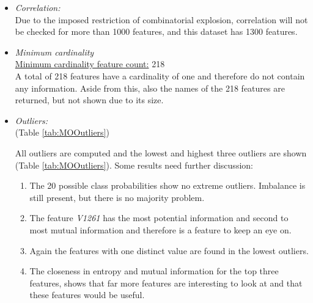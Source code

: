\documentclass[10pt,a4paper]{article}
\begin{document}
	\begin{itemize}
		\item \textit{Correlation:} \\
		
		Due to the imposed restriction of combinatorial explosion, correlation will not be checked for more than 1000 features, and this dataset has 1300 features.
		
		\item \textit{Minimum cardinality} \\
		\underline{Minimum cardinality feature count:} 218 \\

		A total of 218 features have a cardinality of one and therefore do not contain any information. Aside from this, also the names of the 218 features are returned, but not shown due to its size.
		
		\item \textit{Outliers:} \\
		(Table \ref{tab:MOOutliers})
		
		All outliers are computed and the lowest and highest three outliers are shown (Table \ref{tab:MOOutliers}). Some results need further discussion:
		
		\begin{enumerate}
			\item The 20 possible class probabilities show no extreme outliers. Imbalance is still present, but there is no majority problem.
			\item The feature \textit{V1261} has the most potential information and second to most mutual information and therefore is a feature to keep an eye on.
			\item Again the features with one distinct value are found in the lowest outliers.
			\item The closeness in entropy and mutual information for the top three features, shows that far more features are interesting to look at and that these features would be useful.
		\end{enumerate}
		

\end{itemize}
\end{document}
